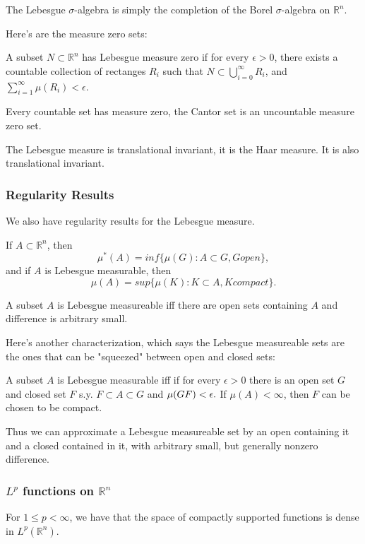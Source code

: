 \documentclass[main.tex]{subfiles}
\begin{document}
\begin{theorem}
The Lebesgue $\sigma$-algebra is simply the completion of the Borel $\sigma$-algebra on $\mathbb{R}^n$.
\end{theorem}

Here's are the measure zero sets:
\begin{lemma}
A subset $N \subset \mathbb{R}^n$ has Lebesgue measure zero if for every $\epsilon > 0$, there exists a countable collection of rectanges $R_i$ such that $N \subset \bigcup_{i = 0}^\infty R_i$, and $\sum_{i = 1} ^\infty \mu(R_i) < \epsilon$.
\end{lemma}

Every countable set has measure zero, the Cantor set is an uncountable measure zero set.

The Lebesgue measure is translational invariant, it is the Haar measure. It is also translational invariant. 


\subsubsection{Regularity Results}
We also have regularity results for the Lebesgue measure. 

\begin{theorem}
If $A \subset \mathbb{R}^n$, then 
$$
\mu^*(A) = inf\{\mu(G): A \subset G, G open\},
$$
and if $A$ is Lebesgue measurable, then 
$$
\mu(A) = sup \{\mu(K): K \subset A, K compact\}.
$$
\end{theorem}

A subset $A$ is Lebesgue measureable iff there are open sets containing $A$ and difference is arbitrary small.

Here's another characterization, which says the Lebesgue measureable sets are the ones that can be "squeezed" between open and closed sets:

\begin{theorem}
A subset $A$ is Lebesgue measurable iff if for every $\epsilon > 0$ there is an open set $G$ and closed set $F$ s.y. $F \subset A \subset G$ and $\mu(G\\F)< \epsilon.$ If $\mu(A) < \infty$, then $F$ can be chosen to be compact.
\end{theorem}

Thus we can approximate a Lebesgue measureable set by an open containing it and a closed contained in it, with arbitrary small, but generally nonzero difference.


\subsubsection{$L^p$ functions on $\mathbb{R}^n$}
\begin{theorem}
For $1 \leq p < \infty$, we have that the space of compactly supported functions is dense in $L^p(\mathbb{R}^n)$.
\end{theorem}
\end{document}
